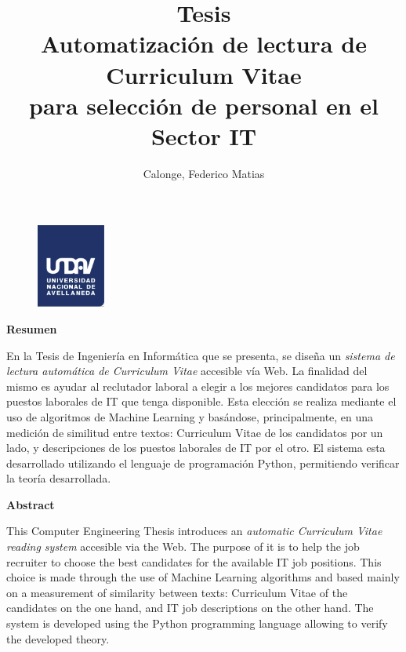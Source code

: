 \documentclass[12pt,a4paper]{article}
\author{
  Calonge, Federico Matias\\
  \text{calongefederico@gmail.com}
}
\title{
  Tesis \\
  \large Automatización de lectura de Curriculum Vitae  \\
    para selección de personal en el Sector IT}
\begin{document}
\begin{figure}
  \centering
  \includegraphics[width=0.2\textwidth]{images/undav-logo.png} 	%
  \label{fig:undav-logo}
\end{figure}
\maketitle       		%

\cleardoublepage    %

\begin{center}
    \Large
    \vspace{0.9cm}
    \textbf{Resumen}
    
\end{center}

En la Tesis de Ingeniería en Informática que se presenta, se diseña un \textit{sistema de lectura automática de Curriculum Vitae} accesible vía Web. La finalidad del mismo es ayudar al reclutador laboral a elegir a los mejores candidatos para los puestos laborales de IT que tenga disponible. Esta elección se realiza mediante el uso de algoritmos de Machine Learning y basándose, principalmente, en una medición de similitud entre textos: Curriculum Vitae de los candidatos por un lado, y descripciones de los puestos laborales de IT por el otro.
El sistema esta desarrollado utilizando el lenguaje de programación Python, permitiendo verificar la teoría desarrollada.

\begin{center}
    \Large
    \vspace{0.9cm}
    \textbf{Abstract}
\end{center}

This Computer Engineering Thesis introduces an \textit{automatic Curriculum Vitae reading system} accesible via the Web. The purpose of it is to help the job recruiter to choose the best candidates for the available IT job positions. This choice is made through the use of Machine Learning algorithms and based mainly on a measurement of similarity between texts: Curriculum Vitae of the candidates on the one hand, and IT job descriptions on the other hand.
The system is developed using the Python programming language allowing to verify the developed theory.
\end{document}
